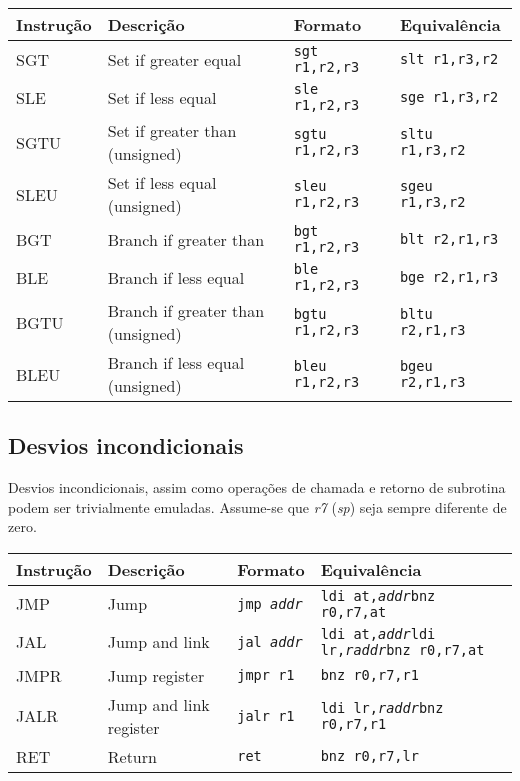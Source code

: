 \documentclass{extreport}
\begin{document}
\begin{table}[ht!]
\centering
\begin{tabular}{|p{2.0cm}|p{4.0cm}|p{3.5cm}|p{3.5cm}|}
\hline
\bf{Instrução} 					& \bf{Descrição} & \bf{Formato} & \bf{Equivalência} \\ \hline \hline
SGT  & Set if greater equal			& \texttt{sgt r1,r2,r3} & \texttt{slt r1,r3,r2} \\ \hline
SLE  & Set if less equal			& \texttt{sle r1,r2,r3} & \texttt{sge r1,r3,r2} \\ \hline
SGTU & Set if greater than (unsigned)		& \texttt{sgtu r1,r2,r3} & \texttt{sltu r1,r3,r2} \\ \hline
SLEU & Set if less equal (unsigned)		& \texttt{sleu r1,r2,r3} & \texttt{sgeu r1,r3,r2} \\ \hline
BGT  & Branch if greater than			& \texttt{bgt r1,r2,r3} & \texttt{blt r2,r1,r3} \\ \hline
BLE  & Branch if less equal			& \texttt{ble r1,r2,r3} & \texttt{bge r2,r1,r3} \\ \hline
BGTU & Branch if greater than (unsigned)	& \texttt{bgtu r1,r2,r3} & \texttt{bltu r2,r1,r3} \\ \hline
BLEU & Branch if less equal (unsigned)		& \texttt{bleu r1,r2,r3} & \texttt{bgeu r2,r1,r3} \\ \hline
\end{tabular}
\end{table}

\subsection{Desvios incondicionais}

Desvios incondicionais, assim como operações de chamada e retorno de subrotina podem ser trivialmente emuladas. Assume-se que \textit{r7} (\textit{sp}) seja sempre diferente de zero.

\begin{table}[ht!]
\centering
\begin{tabular}{|p{2.0cm}|p{4.0cm}|p{3.5cm}|p{3.5cm}|}
\hline
\bf{Instrução} 				& \bf{Descrição} & \bf{Formato} & \bf{Equivalência} \\ \hline \hline
JMP  & Jump				& \texttt{jmp \textit{addr}} & \texttt{ldi at,\textit{addr}\newline bnz r0,r7,at} \\ \hline
JAL  & Jump and link			& \texttt{jal \textit{addr}} & \texttt{ldi at,\textit{addr}\newline ldi lr,\textit{raddr}\newline bnz r0,r7,at} \\ \hline
JMPR & Jump register 			& \texttt{jmpr r1} & \texttt{bnz r0,r7,r1} \\ \hline
JALR & Jump and link register		& \texttt{jalr r1} & \texttt{ldi lr,\textit{raddr}\newline bnz r0,r7,r1} \\ \hline
RET  & Return				& \texttt{ret} & \texttt{bnz r0,r7,lr}\\ \hline
\end{tabular}
\end{table}
\end{document}
